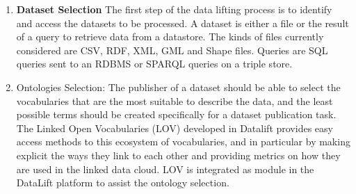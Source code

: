 \begin{itemize}
\begin{figure}[ht!b]
\end{figure}


\begin{enumerate}

\item{\textbf{Dataset Selection}}
The first step of the data lifting process is to identify and access the datasets to be processed. A dataset is either a file or the result of a query to retrieve data from a datastore. The kinds of files currently considered are CSV, RDF, XML, GML and Shape files. Queries are SQL queries sent to an RDBMS or SPARQL queries on a triple store.
\item{Ontologies Selection:}
The publisher of a dataset should be able to select the vocabularies that are the most suitable to describe the data, and the least possible terms should be created specifically for a dataset publication task. The Linked Open Vocabularies \cite{lov11} (LOV) developed in Datalift provides easy access methods to this ecosystem of vocabularies, and in particular by making explicit the ways they link to each other and providing metrics on how they are used in the linked data cloud. LOV is integrated as module in the DataLift platform to assist the ontology selection.


\end{enumerate}
\end{itemize}
